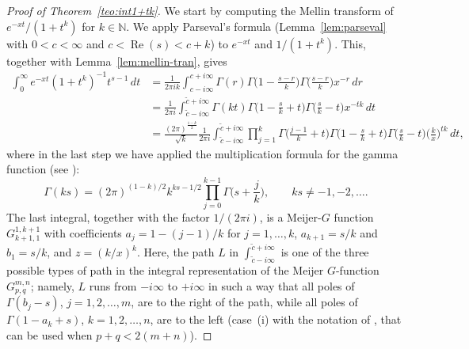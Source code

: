 \documentclass[11pt,a4paper]{amsart}
\renewcommand{\Re}{\operatorname{Re}}
\theoremstyle{plain}
\theoremstyle{plain}
\theoremstyle{remark}
\numberwithin{equation}{section}
\begin{document}
\begin{proof}[Proof of Theorem~\ref{teo:int1+tk}]
We start by computing the Mellin transform of $e^{-xt}/(1+t^k)$ for $k\in \mathbb{N}$. We apply Parseval's formula (Lemma~\ref{lem:parseval} with $0<c<\infty$ and $c<\Re(s)<c+k$) to $e^{-xt}$ and $1/(1+t^k)$. This, together with Lemma~\ref{lem:mellin-tran}, gives
\begin{align*}
  \int_{0}^{\infty} e^{-xt}(1+t^k)^{-1} t^{s-1}\, dt 
  & = \frac{1}{2\pi i k} \int_{c-i\infty}^{c+i\infty} \Gamma(r) 
    \Gamma\Big(1-\frac{s-r}{k}\Big) \Gamma\Big(\frac{s-r}{k}\Big)x^{-r}\, dr \\
  & = \frac{1}{2\pi i} \int_{\tilde{c}-i\infty}^{\tilde{c}+i\infty} 
    \Gamma(kt) \Gamma\Big(1-\frac{s}{k}+t\Big)
    \Gamma\Big(\frac{s}{k}-t\Big) x^{-tk}\, dt \\
  & = \frac{(2\pi)^{\frac{1-k}{2}}}{\sqrt{k}} \frac{1}{2\pi i} 
    \int_{\tilde{c}-i\infty}^{\tilde{c}+i\infty}
    \prod_{j=1}^{k} \Gamma\Big(\frac{j-1}{k} + t\Big) \Gamma\Big(1-\frac{s}{k}+t\Big) 
    \Gamma\Big(\frac{s}{k}-t\Big) \Big(\frac{k}{x}\Big)^{tk}\,dt,
\end{align*}
where in the last step we have applied the multiplication formula for the gamma function (see \cite[\S\,1.2, equation~(11)]{EMOT-HTF-v1}):
\[
  \Gamma(ks) = (2\pi)^{(1-k)/2} k^{ks-1/2} \prod_{j=0}^{k-1} \Gamma\Big(s + \frac{j}{k}\Big),
  \qquad ks \ne -1,-2,\dots.
\]
The last integral, together with the factor $1/(2\pi i)$, is a Meijer-$G$ function $G_{k+1,1}^{1,k+1}$ with coefficients $a_j = 1-(j-1)/k$ for $j=1,\dots, k$, $a_{k+1}=s/k$ and $b_1=s/k$, and $z=(k/x)^k$. 
Here, the path $L$ in $\int_{\tilde{c}-i\infty}^{\tilde{c}+i\infty}$ is one of the three possible types of path in the integral representation of the Meijer $G$-function $G_{p,q}^{m,n}$; namely, $L$ runs from $-i\infty$ to $+i\infty$ in such a way that all poles of $\Gamma(b_j - s)$, $j = 1, 2, \dots, m$, are to the right of the path, while all poles of $\Gamma(1 - a_k + s)$, $k = 1, 2, \dots, n$, are to the left (case~(i) with the notation of \cite[\S\,16.17]{AsOl-NIST}, that can be used when $p+q<2(m+n)$).
\end{proof}
\end{document}
